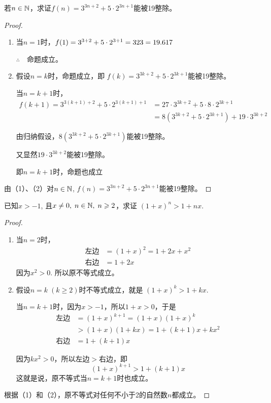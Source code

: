 \begin{example}
    若$n\in\mathbb{N}$，求证$f(n)=3^{3n+2}+5\cdot 2^{3n+1}$能被19整除。
\end{example}

\begin{proof}
\begin{enumerate}[(1)]
    \item 
当$n=1$时，$f(1)=3^{3+2}+5\cdot 2^{3+1}=323=19.617$

$\therefore\quad $命题成立。
\item 假设$n=k$时，命题成立，即
$f(k)=3^{3k+2}+5\cdot 2^{3k+1}$能被19整除。

当$n=k+1$时，
\[\begin{split}
f(k+1)=3^{3(k+1)+2}+5\cdot 2^{3(k+1)+1}&=27\cdot 3^{3k+2}+5\cdot 8\cdot 2^{3k+1}\\
&=8(3^{3k+2}+5\cdot 2^{3k+1})+19\cdot 3^{3k+2}    
\end{split}\]

由归纳假设，$8(3^{3k+2}+5\cdot 2^{3k+1})$能被19整除。

又显然$19\cdot 3^{3k+2}$能被19整除。

即$n=k+1$时，命题也成立
\end{enumerate} 

由（1）、（2）对$n\in\mathbb{N}$, $f(n)=3^{3n+2}+5\cdot 2^{3n+1}$能被19整除。
\end{proof}



\begin{example}
    已知$x>-1$, 且$x\ne 0,\; n\in\mathbb{N},\; n\geqslant 2$，求证
$(1+x)^n>1+nx$.
\end{example}

\begin{proof}
\begin{enumerate}[(1)]
    \item  当$n=2$时，
\[\begin{split}
\text{左边}&=(1+x)^2=1+2x+x^2\\
\text{右边}&=1+2x    
\end{split}\]
因为$x^2>0$. 所以原不等式成立。
\item 假设$n=k\; (k\ge 2)$时不等式成立，就是
$(1+x)^k>1+kx$.

当$n=k+1$时，因为$x>-1$，所以$1+x>0$，于是
\[\begin{split}
\text{左边}&=(1+x)^{k+1}=(1+x)(1+x)^k\\
&>(1+x)(1+kx)=1+(k+1)x+kx^2\\
\text{右边}&=1+(k+1)x    
\end{split}\]

因为$kx^2>0$，所以左边$>$右边，即
\[(1+x)^{k+1}>1+(k+1)x\]
这就是说，原不等式当$n=k+1$时也成立。
\end{enumerate}

根据（1）和（2），原不等式对任何不小于2的自然数$n$都成立。
\end{proof}



